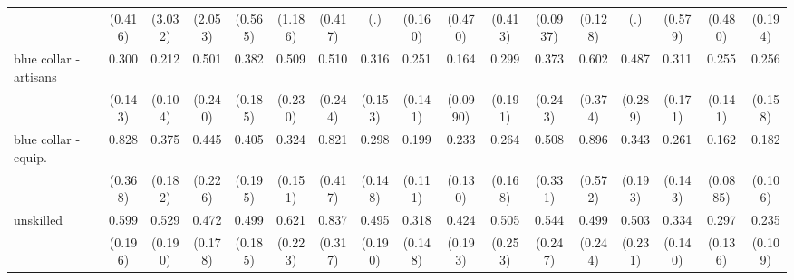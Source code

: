 {\begin{tabular}{l*{16}{c}}
                    &     (0.416)         &     (3.032)         &     (2.053)         &     (0.565)         &     (1.186)         &     (0.417)         &         (.)         &     (0.160)         &     (0.470)         &     (0.413)         &    (0.0937)         &     (0.128)         &         (.)         &     (0.579)         &     (0.480)         &     (0.194)         \\
[1em]
blue collar - artisans&       0.300\sym{*}  &       0.212\sym{**} &       0.501         &       0.382\sym{*}  &       0.509         &       0.510         &       0.316\sym{*}  &       0.251\sym{*}  &       0.164\sym{**} &       0.299         &       0.373         &       0.602         &       0.487         &       0.311\sym{*}  &       0.255\sym{*}  &       0.256\sym{*}  \\
                    &     (0.143)         &     (0.104)         &     (0.240)         &     (0.185)         &     (0.230)         &     (0.244)         &     (0.153)         &     (0.141)         &    (0.0990)         &     (0.191)         &     (0.243)         &     (0.374)         &     (0.289)         &     (0.171)         &     (0.141)         &     (0.158)         \\
[1em]
blue collar - equip.&       0.828         &       0.375\sym{*}  &       0.445         &       0.405         &       0.324\sym{*}  &       0.821         &       0.298\sym{*}  &       0.199\sym{**} &       0.233\sym{**} &       0.264\sym{*}  &       0.508         &       0.896         &       0.343         &       0.261\sym{*}  &       0.162\sym{***}&       0.182\sym{**} \\
                    &     (0.368)         &     (0.182)         &     (0.226)         &     (0.195)         &     (0.151)         &     (0.417)         &     (0.148)         &     (0.111)         &     (0.130)         &     (0.168)         &     (0.331)         &     (0.572)         &     (0.193)         &     (0.143)         &    (0.0885)         &     (0.106)         \\
[1em]
unskilled           &       0.599         &       0.529         &       0.472\sym{*}  &       0.499         &       0.621         &       0.837         &       0.495         &       0.318\sym{*}  &       0.424         &       0.505         &       0.544         &       0.499         &       0.503         &       0.334\sym{**} &       0.297\sym{**} &       0.235\sym{**} \\
                    &     (0.196)         &     (0.190)         &     (0.178)         &     (0.185)         &     (0.223)         &     (0.317)         &     (0.190)         &     (0.148)         &     (0.193)         &     (0.253)         &     (0.247)         &     (0.244)         &     (0.231)         &     (0.140)         &     (0.136)         &     (0.109)         \\

\end{tabular}}
